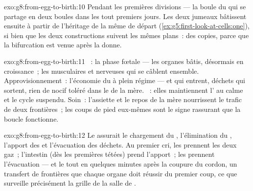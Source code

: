 \begin{solution}{exo:g8:from-egg-to-birth:10}
Pendant les premières divisions --- la boule du  qui se
partage en deux boules dans les tout premiers jours. Les deux
jumeaux bâtissent ensuite à partir de l'héritage de la même 
de départ (\cref{ex:g5:first-look-at-cells:one}), si bien que les
deux constructions suivent les mêmes plans~: des copies, parce que
la bifurcation est venue après la donne.
\end{solution}

\begin{solution}{exo:g8:from-egg-to-birth:11}
~: la phase fœtale --- les organes bâtis, désormais en
croissance~; les  musculaires et nerveuses qui se câblent
ensemble. Approvisionnement~: l'économie du  à plein régime
---  et  qui entrent, déchets qui sortent, rien
de nocif toléré dans le  de la mère. ~: elles
maintiennent l' au calme et le cycle suspendu. Soin~:
l'assiette et le repos de la mère nourrissent le trafic de deux
frontières~; les coups de pied eux-mêmes sont le signe rassurant que
la boucle fonctionne.
\end{solution}

\begin{solution}{exo:g8:from-egg-to-birth:12}
Le  assurait le chargement du , l'élimination du
, l'apport des  et l'évacuation des
déchets. Au premier cri, les  prennent les deux gaz~;
l'intestin (dès les premières tétées) prend l'apport~; les 
prennent l'évacuation --- et le tout en quelques minutes après la
coupure du cordon, un transfert de frontières que chaque organe doit
réussir du premier coup, ce que surveille précisément la grille de
la salle de .
\end{solution}

